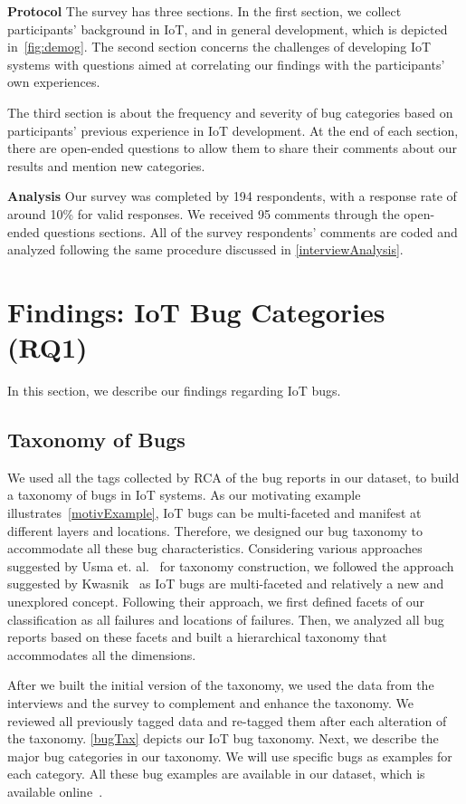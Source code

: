 \textbf{Protocol}
The survey has three sections. In the first section, we collect participants' background in IoT, and in general development, which is depicted in~\autoref{fig:demog}. The second section concerns the challenges of developing IoT systems with questions aimed at correlating our findings with the participants' own experiences. 

The third section is about the frequency and severity of bug categories based on participants' previous experience in IoT development. At the end of each section, there are open-ended questions to allow them to share their comments about our results and mention new categories.

\textbf{Analysis}
Our survey was completed by 194 respondents, with a response rate of around 10\% for valid responses. 
 We received 95 comments through the open-ended questions sections. All of the survey respondents' comments are coded and analyzed following the same procedure discussed in \autoref{interviewAnalysis}.

\section{Findings: IoT Bug Categories (RQ1)}
In this section, we describe our findings regarding IoT bugs. 


\subsection{Taxonomy of Bugs}
We used all the tags collected by RCA of the bug reports in our dataset, to build a taxonomy of bugs in IoT systems. As our motivating example illustrates~\autoref{motivExample}, IoT bugs can be multi-faceted and manifest at different layers and locations. Therefore, we designed our bug taxonomy to accommodate all these bug characteristics. Considering various approaches suggested by Usma et. al.~\cite{usman2017taxonomies} for taxonomy construction, we followed the approach suggested by Kwasnik~\cite{kwasnik1999role} as IoT bugs are multi-faceted and relatively a new and unexplored concept. Following their approach, we first defined facets of our classification as all failures and locations of failures. Then, we analyzed all bug reports based on these facets and built a hierarchical taxonomy that accommodates all the dimensions.

After we built the initial version of the taxonomy, we used the data from the interviews and the survey to complement and enhance the taxonomy. We reviewed all previously tagged data and re-tagged them after each alteration of the taxonomy. \autoref{bugTax} depicts our IoT bug taxonomy. Next, we describe the major bug categories in our taxonomy. We will use specific bugs as examples for each category. All these bug examples are available in our dataset, which is available online~\cite{repPack}. 


